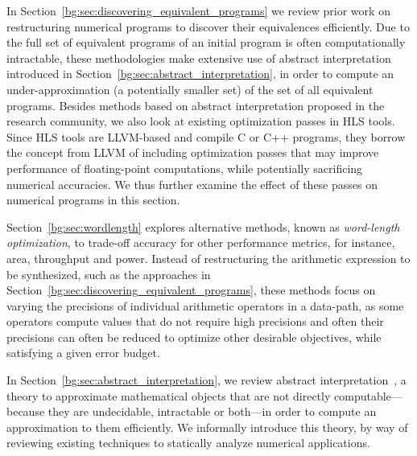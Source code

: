 In Section~\ref{bg:sec:discovering_equivalent_programs} we review prior work on
restructuring numerical programs to discover their equivalences efficiently.
Due to the full set of equivalent programs of an initial program is often
computationally intractable, these methodologies make extensive use of abstract
interpretation introduced in Section~\ref{bg:sec:abstract_interpretation}, in
order to compute an under-approximation (a potentially smaller set) of the set
of all equivalent programs.  Besides methods based on abstract interpretation
proposed in the research community, we also look at existing optimization
passes in HLS tools.  Since HLS tools are LLVM-based and compile C or C++
programs, they borrow the concept from LLVM of including optimization passes
that may improve performance of floating-point computations, while potentially
sacrificing numerical accuracies.  We thus further examine the effect of these
passes on numerical programs in this section.

Section~\ref{bg:sec:wordlength} explores alternative methods, known as
\emph{word-length optimization}, to trade-off accuracy for other performance
metrics, for instance, area, throughput and power.  Instead of restructuring
the arithmetic expression to be synthesized, such as the approaches in
Section~\ref{bg:sec:discovering_equivalent_programs}, these methods focus on
varying the precisions of individual arithmetic operators in a data-path, as
some operators compute values that do not require high precisions and often
their precisions can often be reduced to optimize other desirable objectives,
while satisfying a given error budget.

In Section~\ref{bg:sec:abstract_interpretation}, we review abstract
interpretation~\cite{cousot77}, a theory to approximate mathematical objects
that are not directly computable---because they are undecidable, intractable or
both---in order to compute an approximation to them efficiently.  We informally
introduce this theory, by way of reviewing existing techniques to statically
analyze numerical applications.
